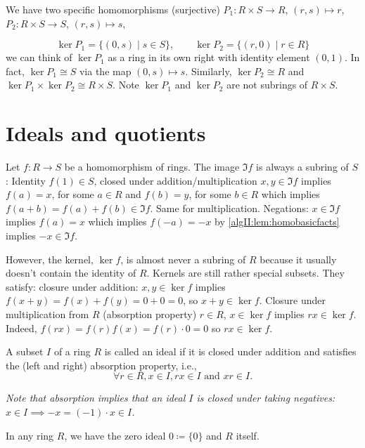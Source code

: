 \documentclass[10pt, a4paper]{article}
\begin{document}
\begin{example}
    We have two specific homomorphisms
    (surjective)
    $P_1 : R \times S \to R$,
    $(r, s) \mapsto r$,
    $P_2 : R \times S \to S$,
    $(r, s) \mapsto s$,

    \[
    \ker{P_1} = \{(0, s) \mid s \in S\},\qquad \ker{P_2} = \{(r, 0) \mid r \in R\}
    \]
    we can think of $\ker{P_1}$ as a ring in its own right with identity element $(0, 1)$.
    In fact,
    $\ker{P_1} \cong S$ via the map $(0, s) \mapsto s$.
    Similarly,
    $\ker{P_2} \cong R$ and $\ker{P_1} \times \ker{P_2} \cong R \times S$.
    Note $\ker{P_1}$ and $\ker{P_2}$ are not subrings of $R \times S$.
\end{example}

\newpage

\section{Ideals and quotients}
Let $f : R \to S$ be a homomorphism of rings.
The image $\Im{f}$ is always a subring of $S$:
Identity $f(1) \in S$,
closed under addition/multiplication $x, y \in \Im{f}$ implies $f(a) = x$,
for some $a \in R$ and $f(b) = y$,
for some $b \in R$ which implies $f(a + b) = f(a) + f(b) \in \Im{f}$.
Same for multiplication.
Negations:
$x \in \Im{f}$ implies $f(a) = x$ which implies $f(-a) = -x$ by \autoref{algII:lem:homobasicfacts} implies $-x \in \Im{f}$.

However,
the kernel,
$\ker{f}$,
is almost never a subring of $R$ because it usually doesn't contain the identity of $R$.
Kernels are still rather special subsets.
They satisfy:
closure under addition:
$x, y \in \ker{f}$ implies $f(x + y) = f(x) + f(y) = 0 + 0 = 0$,
so $x + y \in \ker{f}$.
Closure under multiplication from $R$
(absorption property)
$r \in R$,
$x \in \ker{f}$ implies $rx \in \ker{f}$.
Indeed,
$f(rx) = f(r)f(x) = f(r)\cdot 0 = 0$ so $rx \in \ker{f}$.

\begin{definition}
    A subset $I$ of a ring $R$ is called an ideal if it is closed under addition and satisfies the
    (left and right)
    absorption property,
    i.e.,
    \[
    \forall r \in R, x \in I, rx \in I \text{ and } xr \in I.
    \]
\end{definition}

\textit{Note that absorption implies that an ideal $I$ is closed under taking negatives:
$x \in I \implies -x = (-1)\cdot x \in I$.}

In any ring $R$,
we have the zero ideal $0 \coloneqq \{0\}$ and $R$ itself.
\end{document}
